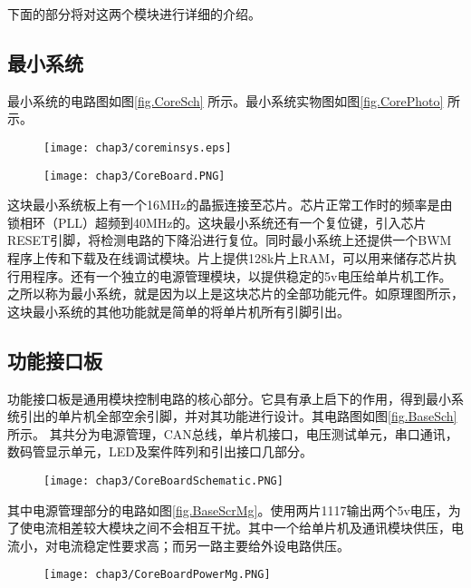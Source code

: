 下面的部分将对这两个模块进行详细的介绍。

\subsection{最小系统}
最小系统的电路图如图\ref{fig.CoreSch} 所示。最小系统实物图如图\ref{fig.CorePhoto} 所示。 \\
\begin{figure}[!htp]
  \centering
  \texttt{[image: chap3/coreminsys.eps]}
\end{figure}
\begin{figure}[!htp]
  \centering
  \texttt{[image: chap3/CoreBoard.PNG]}
\end{figure}

这块最小系统板上有一个16MHz的晶振连接至芯片。芯片正常工作时的频率是由锁相环（PLL）超频到40MHz的。这块最小系统还有一个复位键，引入芯片RESET引脚，将检测电路的下降沿进行复位。同时最小系统上还提供一个BWM程序上传和下载及在线调试模块。片上提供128k片上RAM，可以用来储存芯片执行用程序。还有一个独立的电源管理模块，以提供稳定的5v电压给单片机工作。之所以称为最小系统，就是因为以上是这块芯片的全部功能元件。如原理图所示，这块最小系统的其他功能就是简单的将单片机所有引脚引出。 

\subsection{功能接口板}
功能接口板是通用模块控制电路的核心部分。它具有承上启下的作用，得到最小系统引出的单片机全部空余引脚，并对其功能进行设计。其电路图如图\ref{fig.BaseSch} 所示。 其共分为电源管理，CAN总线，单片机接口，电压测试单元，串口通讯，数码管显示单元，LED及案件阵列和引出接口几部分。 
\begin{figure}[!htp]
  \centering
  \texttt{[image: chap3/CoreBoardSchematic.PNG]}
\end{figure}


其中电源管理部分的电路如图\ref{fig.BaseScrMg}。使用两片1117输出两个5v电压，为了使电流相差较大模块之间不会相互干扰。其中一个给单片机及通讯模块供压，电流小，对电流稳定性要求高；而另一路主要给外设电路供压。 
\begin{figure}[!htp]
  \centering
  \texttt{[image: chap3/CoreBoardPowerMg.PNG]}
\end{figure}


